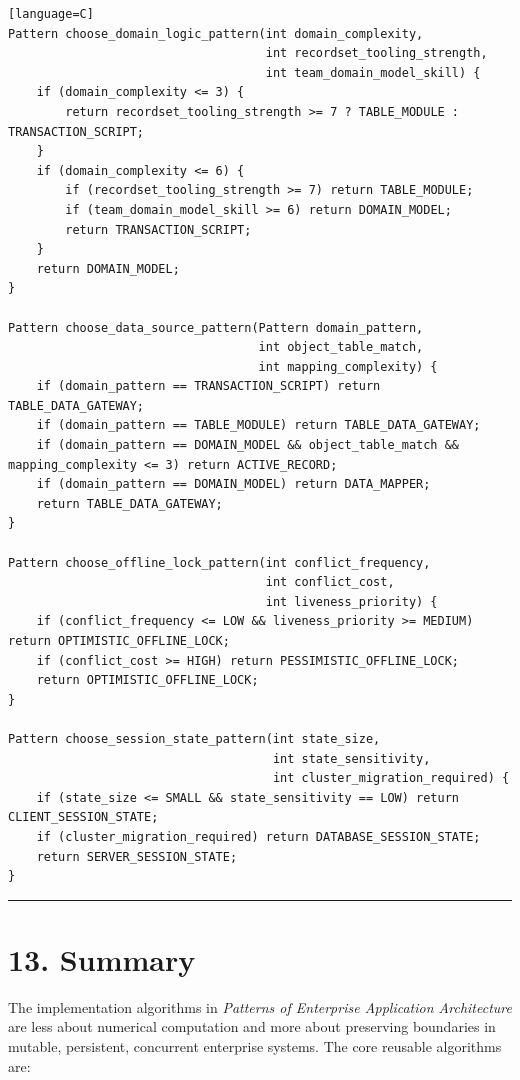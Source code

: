 \documentclass[11pt]{article}
\begin{document}
\begin{verbatim}[language=C]
Pattern choose_domain_logic_pattern(int domain_complexity,
                                    int recordset_tooling_strength,
                                    int team_domain_model_skill) {
    if (domain_complexity <= 3) {
        return recordset_tooling_strength >= 7 ? TABLE_MODULE : TRANSACTION_SCRIPT;
    }
    if (domain_complexity <= 6) {
        if (recordset_tooling_strength >= 7) return TABLE_MODULE;
        if (team_domain_model_skill >= 6) return DOMAIN_MODEL;
        return TRANSACTION_SCRIPT;
    }
    return DOMAIN_MODEL;
}

Pattern choose_data_source_pattern(Pattern domain_pattern,
                                   int object_table_match,
                                   int mapping_complexity) {
    if (domain_pattern == TRANSACTION_SCRIPT) return TABLE_DATA_GATEWAY;
    if (domain_pattern == TABLE_MODULE) return TABLE_DATA_GATEWAY;
    if (domain_pattern == DOMAIN_MODEL && object_table_match && mapping_complexity <= 3) return ACTIVE_RECORD;
    if (domain_pattern == DOMAIN_MODEL) return DATA_MAPPER;
    return TABLE_DATA_GATEWAY;
}

Pattern choose_offline_lock_pattern(int conflict_frequency,
                                    int conflict_cost,
                                    int liveness_priority) {
    if (conflict_frequency <= LOW && liveness_priority >= MEDIUM) return OPTIMISTIC_OFFLINE_LOCK;
    if (conflict_cost >= HIGH) return PESSIMISTIC_OFFLINE_LOCK;
    return OPTIMISTIC_OFFLINE_LOCK;
}

Pattern choose_session_state_pattern(int state_size,
                                     int state_sensitivity,
                                     int cluster_migration_required) {
    if (state_size <= SMALL && state_sensitivity == LOW) return CLIENT_SESSION_STATE;
    if (cluster_migration_required) return DATABASE_SESSION_STATE;
    return SERVER_SESSION_STATE;
}
\end{verbatim}

\begin{center}\rule{0.5\linewidth}{0.5pt}\end{center}

\section{13. Summary}\label{summary}

The implementation algorithms in \emph{Patterns of Enterprise
Application Architecture} are less about numerical computation and more
about preserving boundaries in mutable, persistent, concurrent
enterprise systems. The core reusable algorithms are:
\end{document}
